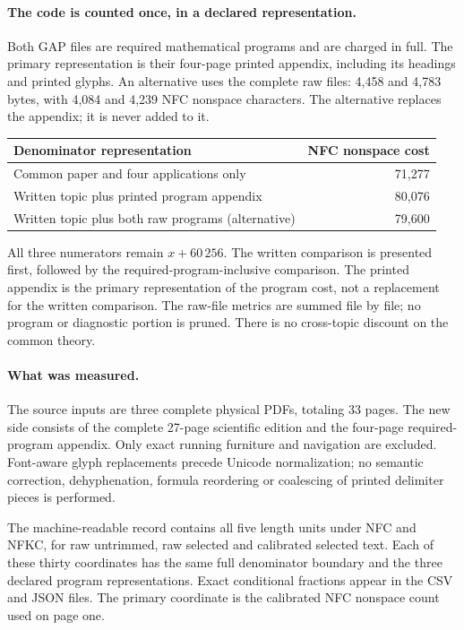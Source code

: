 \documentclass[11pt,a4paper]{article}
\begin{document}
\paragraph{The code is counted once, in a declared representation.}
Both GAP files are required mathematical programs and are charged in full.
The primary representation is their four-page printed appendix, including
its headings and printed glyphs. An alternative uses the complete raw files:
4,458 and 4,783 bytes, with 4,084 and 4,239 NFC nonspace characters.
The alternative replaces the appendix; it is never added to it.
\begin{center}\begin{tabular}{p{.64\linewidth}r}\toprule
Denominator representation & NFC nonspace cost\\\midrule
Common paper and four applications only & 71,277\\
Written topic plus printed program appendix & 80,076\\
Written topic plus both raw programs (alternative) & 79,600\\\bottomrule
\end{tabular}\end{center}
All three numerators remain $x+60\,256$. The written comparison is presented
first, followed by the required-program-inclusive comparison. The printed
appendix is the primary representation of the program cost, not a replacement
for the written comparison.
The raw-file metrics are summed file by file; no program or diagnostic
portion is pruned. There is no cross-topic discount on the common theory.

\paragraph{What was measured.}
The source inputs are three complete physical PDFs, totaling 33 pages.
The new side consists of the complete 27-page scientific edition and the
four-page required-program appendix. Only exact running furniture and
navigation are excluded. Font-aware glyph replacements precede Unicode
normalization; no semantic correction, dehyphenation, formula reordering or
coalescing of printed delimiter pieces is performed.

The machine-readable record contains all five length units under NFC and
NFKC, for raw untrimmed, raw selected and calibrated selected text. Each of
these thirty coordinates has the same full denominator boundary and the
three declared program representations. Exact conditional fractions appear
in the CSV and JSON files. The primary coordinate is the calibrated NFC
nonspace count used on page one.
\end{document}
